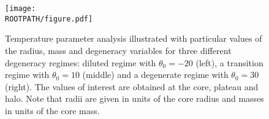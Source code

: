 \begin{figure}%
	\centering%
	\texttt{[image: \\ROOTPATH/figure.pdf]}
	\caption{Temperature parameter analysis illustrated with particular values of the radius, mass and degeneracy variables for three different degeneracy regimes: diluted regime with $\theta_0 = -20$ (left), a transition regime with $\theta_0 = 10$ (middle) and a degenerate regime with $\theta_0 = 30$ (right). The values of interest are obtained at the core, plateau and halo. Note that radii are given in units of the core radius and masses in units of the core mass.}%
	\label{fig:analysis:without-cutoff:central-temperature}%
\end{figure}
